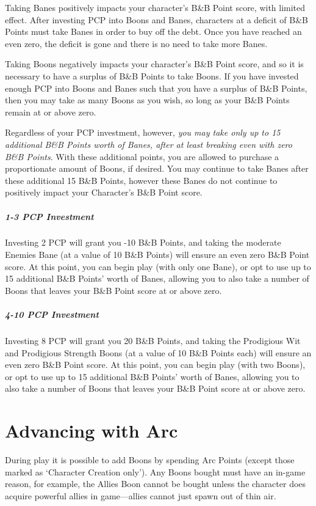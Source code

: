 \documentclass[oneside,11pt,english]{book}
\begin{document}
Taking Banes positively impacts your character's B\&B Point score, with limited effect. After investing 
PCP into Boons and Banes, characters at a deficit of B\&B Points must take Banes in order to buy off the 
debt. Once you have reached an even zero, the deficit is gone and there is no need to take more Banes. 


Taking Boons negatively impacts your character's B\&B Point score, and so it is necessary to have a 
surplus of B\&B Points to take Boons. If you have invested enough PCP into Boons and Banes such that 
you have a surplus of B\&B Points, then you may take as many Boons as you wish, so long as your B\&B 
Points remain at or above zero. 


Regardless of your PCP investment, however, \emph{you may take only up to 15 additional B\&B Points worth 
  of Banes, after at least breaking even with zero B\&B Points}. With these additional points, you are allowed 
to purchase a proportionate amount of Boons, if desired. You may continue to take Banes after these 
additional 15 B\&B Points, however these Banes do not continue to positively impact your Character’s 
B\&B Point score. 


\subparagraph{1-3 PCP Investment}
Investing 2 PCP will grant you -10 B\&B Points, and taking the moderate Enemies Bane (at a value of 10 B\&B Points) will 
ensure an even zero B\&B Point score. At this point, you can begin play (with only one Bane), or opt to use up to 15 additional 
B\&B Points' worth of Banes, allowing you to also take a number of Boons that leaves your B\&B Point score at or above zero.

\subparagraph{4-10 PCP Investment}
Investing 8 PCP will grant you 20 B\&B Points, and taking the Prodigious Wit and Prodigious Strength Boons (at a value of 10 
B\&B Points each) will ensure an even zero B\&B Point score. At this point, you can begin play (with two Boons), or opt to use up 
to 15 additional B\&B Points’ worth of Banes, allowing you to also take a number of Boons that leaves your B\&B Point score at or above zero. 
\section{Advancing with Arc}
During play it is possible to add Boons by spending Arc Points (except those marked as ‘Character 
Creation only’). Any Boons bought must have an in-game reason, for example, the Allies Boon cannot be 
bought unless the character does acquire powerful allies in game—allies cannot just spawn out of thin air. 
\end{document}
